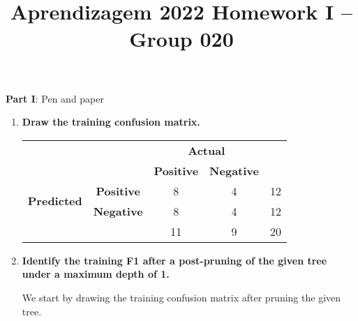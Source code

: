 \documentclass[12pt]{article}
\title{\large{Aprendizagem 2022}\vskip 0.2cm Homework I -- Group 020}
\date{}
\author{}
\begin{document}
\maketitle
\center\large{\vskip -2.5cm\textbf{Part I}: Pen and paper}
\begin{enumerate}[leftmargin=\labelsep]
    Given the following decision tree learnt from 20 observation using Shannon entropy, with leaf annotations (\texttt{\#correct/\#total}).
    \item \textbf{Draw the training confusion matrix.}\\
          \vspace{0.5em}
          \begin{center}

              \begin{tabular}{|c|c|c|c|c|}
                  \cline{3-4}
                  \multicolumn{2}{c}{}                & \multicolumn{2}{|c|}{\textbf{Actual}} & \multicolumn{1}{c}{}                             \\
                  \cline{3-4}
                  \multicolumn{2}{c|}{}               & \textbf{Positive}                     & \textbf{Negative}    & \multicolumn{1}{c}{}      \\
                  \hline
                  \multirow{2}{*}{\textbf{Predicted}} & \textbf{Positive}                     & 8                    & 4                    & 12 \\
                  \cline{2-5}
                                                      & \textbf{Negative}                     & 8                    & 4                    & 12 \\
                  \hline
                  \multicolumn{2}{c|}{}               & 11                                    & 9                    & 20                        \\
                  \cline{3-5}
              \end{tabular}
          \end{center}

    \item \textbf{Identify the training F1 after a post-pruning of the given tree under a maximum depth of 1.}

          We start by drawing the training confusion matrix after pruning the given tree.

          \begin{center}


\end{center}
\end{enumerate}
\end{document}
